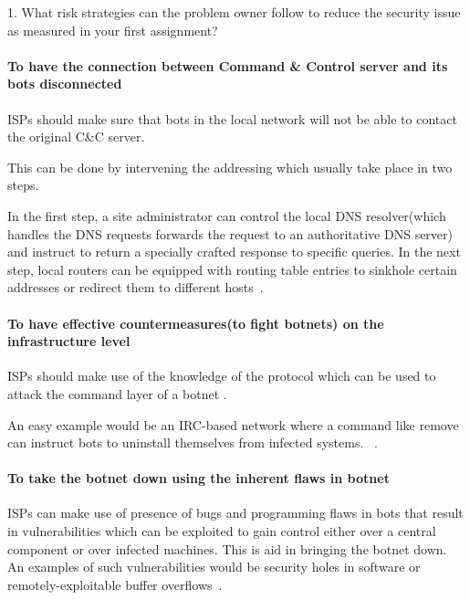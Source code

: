 1.	What risk strategies can the problem owner follow to reduce the security issue as measured in your first assignment?


\paragraph{To have the connection between Command & Control server and its bots disconnected}

ISPs should make sure that bots in the local network will not be able to contact the original C\&C server.

This can be done by intervening the addressing which usually take place in two steps.

In the first step, a site administrator can control the local DNS resolver(which handles the DNS requests forwards the request to an authoritative DNS server) and instruct to return a specially crafted response to specific queries. In the next step, local routers can be equipped with routing table entries to sinkhole certain addresses or redirect them to different hosts~\cite{leder2009proactive}.


\paragraph{To have effective countermeasures(to fight botnets) on the infrastructure level}

ISPs should make use of the knowledge of the protocol which can be used to attack the command layer of a botnet .

An easy example would be an IRC-based network where a command like remove can instruct bots to uninstall themselves from infected systems. ~\cite{leder2009proactive}.


\paragraph{To take the botnet down using the inherent flaws in botnet}

ISPs can make use of presence of bugs and programming flaws in bots that result in vulnerabilities which can be exploited to gain control either over a central component or over infected machines. This is aid in bringing the botnet down. An examples of such vulnerabilities would be security holes in software or remotely-exploitable buffer overflows~\cite{leder2009proactive}.

